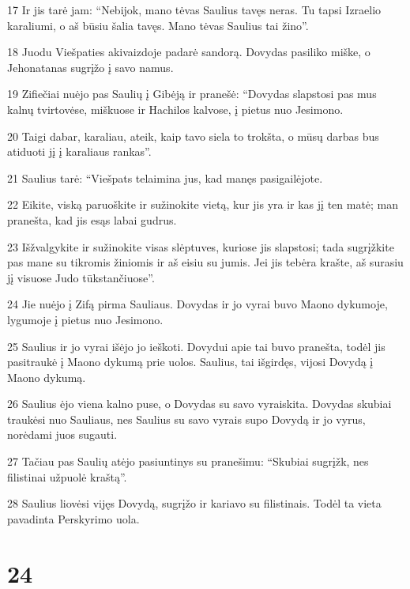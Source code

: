 \par 17 Ir jis tarė jam: “Nebijok, mano tėvas Saulius tavęs neras. Tu tapsi Izraelio karaliumi, o aš būsiu šalia tavęs. Mano tėvas Saulius tai žino”. 
\par 18 Juodu Viešpaties akivaizdoje padarė sandorą. Dovydas pasiliko miške, o Jehonatanas sugrįžo į savo namus. 
\par 19 Zifiečiai nuėjo pas Saulių į Gibėją ir pranešė: “Dovydas slapstosi pas mus kalnų tvirtovėse, miškuose ir Hachilos kalvose, į pietus nuo Jesimono. 
\par 20 Taigi dabar, karaliau, ateik, kaip tavo siela to trokšta, o mūsų darbas bus atiduoti jį į karaliaus rankas”. 
\par 21 Saulius tarė: “Viešpats telaimina jus, kad manęs pasigailėjote. 
\par 22 Eikite, viską paruoškite ir sužinokite vietą, kur jis yra ir kas jį ten matė; man pranešta, kad jis esąs labai gudrus. 
\par 23 Išžvalgykite ir sužinokite visas slėptuves, kuriose jis slapstosi; tada sugrįžkite pas mane su tikromis žiniomis ir aš eisiu su jumis. Jei jis tebėra krašte, aš surasiu jį visuose Judo tūkstančiuose”. 
\par 24 Jie nuėjo į Zifą pirma Sauliaus. Dovydas ir jo vyrai buvo Maono dykumoje, lygumoje į pietus nuo Jesimono. 
\par 25 Saulius ir jo vyrai išėjo jo ieškoti. Dovydui apie tai buvo pranešta, todėl jis pasitraukė į Maono dykumą prie uolos. Saulius, tai išgirdęs, vijosi Dovydą į Maono dykumą. 
\par 26 Saulius ėjo viena kalno puse, o Dovydas su savo vyrais­kita. Dovydas skubiai traukėsi nuo Sauliaus, nes Saulius su savo vyrais supo Dovydą ir jo vyrus, norėdami juos sugauti. 
\par 27 Tačiau pas Saulių atėjo pasiuntinys su pranešimu: “Skubiai sugrįžk, nes filistinai užpuolė kraštą”. 
\par 28 Saulius liovėsi vijęs Dovydą, sugrįžo ir kariavo su filistinais. Todėl ta vieta pavadinta Perskyrimo uola.



\chapter{24}


